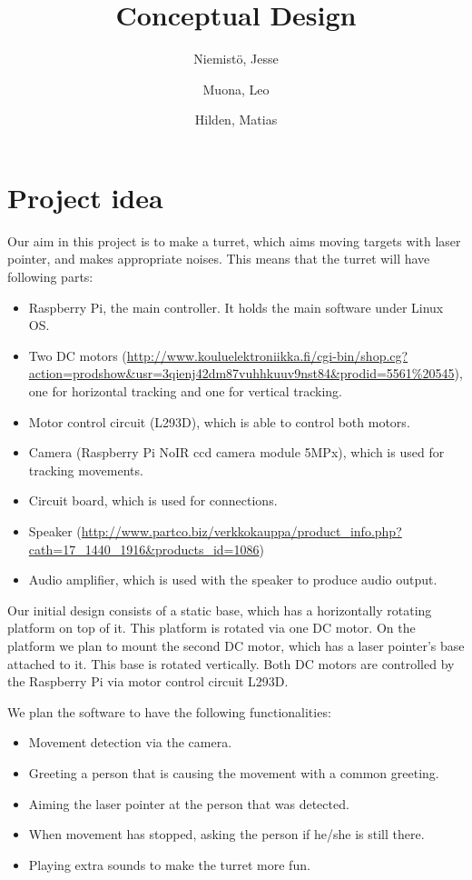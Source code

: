 \documentclass[english,11pt,twoside,a4paper]{article}
\begin{document}
\author{
  Niemistö, Jesse
  \and
  Muona, Leo
  \and
  Hilden, Matias
}
\title{Conceptual Design}

\maketitle

\section{Project idea}

Our aim in this project is to make a turret, which aims moving targets with laser pointer, and makes appropriate noises. This means that the turret will have following parts:

\begin{itemize}
  \item Raspberry Pi, the main controller. It holds the main software under Linux OS.
  \item Two DC motors (\url{http://www.kouluelektroniikka.fi/cgi-bin/shop.cg?action=prodshow\&usr=3qienj42dm87vuhhkuuv9nst84\&prodid=5561\%20545}), one for horizontal tracking and one for vertical tracking.
  \item Motor control circuit (L293D), which is able to control both motors.
  \item Camera (Raspberry Pi NoIR ccd camera module 5MPx), which is used for tracking movements.
  \item Circuit board, which is used for connections.
  \item Speaker (\url{http://www.partco.biz/verkkokauppa/product\_info.php?cath=17\_1440\_1916\&products\_id=1086})
  \item Audio amplifier, which is used with the speaker to produce audio output.
\end{itemize}

Our initial design consists of a static base, which has a horizontally rotating platform on top of it. This platform is rotated via one DC motor. On the platform we plan to mount the second DC motor, which has a laser pointer's base attached to it. This base is rotated vertically. Both DC motors are controlled by the Raspberry Pi via motor control circuit L293D.

We plan the software to have the following functionalities:

\begin{itemize}
  \item Movement detection via the camera.
  \item Greeting a person that is causing the movement with a common greeting.
  \item Aiming the laser pointer at the person that was detected.
  \item When movement has stopped, asking the person if he/she is still there.
  \item Playing extra sounds to make the turret more fun.
\end{itemize}
\end{document}
